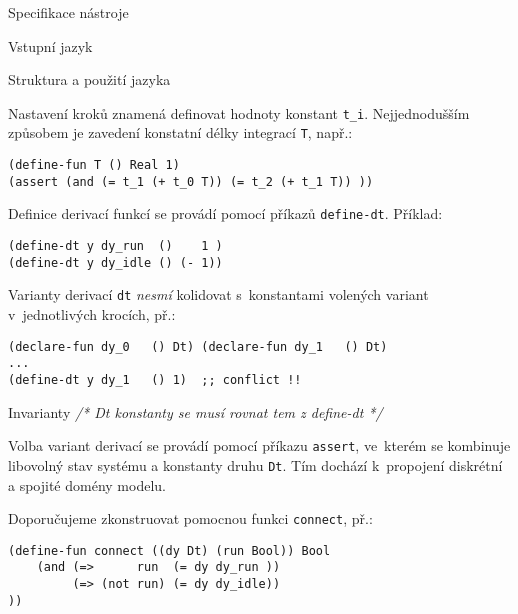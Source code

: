 \documentclass[thesis=M,czech]{FITthesis}[2012/06/26]
\newcommand{\cmt}[1]{\textit{/* #1 */}}
\newcommand{\id}[1]{\texttt{#1}}
\newcommand{\hl}[1]{\textit{#1}}
\begin{document}
\begin{section}{Specifikace nástroje}
\begin{subsection}{Vstupní jazyk}
\begin{subsubsection}{Struktura a použití jazyka}

\begin{paragraph}{Nastavení kroků}\label{p:design:spec:ilang:struct:step}
znamená definovat hodnoty konstant \id{t\_\-i}.
Nejjednodušším způsobem je zavedení konstatní délky
integrací \id{T}, např.:
\begin{verbatim}
(define-fun T () Real 1)
(assert (and (= t_1 (+ t_0 T)) (= t_2 (+ t_1 T)) ))
\end{verbatim}
\end{paragraph} %


\begin{paragraph}{Definice derivací funkcí}
\label{p:design:spec:ilang:struct:ode}
se provádí pomocí příkazů \id{define\--dt}.
Příklad:
\begin{verbatim}
(define-dt y dy_run  ()    1 )
(define-dt y dy_idle () (- 1))
\end{verbatim}

Varianty derivací \id{dt} \hl{nesmí} kolidovat s~konstantami
volených variant v~jednotlivých krocích, př.:
\begin{verbatim}
(declare-fun dy_0   () Dt) (declare-fun dy_1   () Dt)
...
(define-dt y dy_1   () 1)  ;; conflict !!
\end{verbatim}
\end{paragraph} %


\begin{paragraph}{Invarianty}
\label{p:design:spec:ilang:struct:inv}
\cmt{Dt konstanty se musí rovnat tem z define-dt}
\end{paragraph} %


\begin{paragraph}{Volba variant derivací}
\label{p:design:spec:ilang:struct:connect}
se provádí pomocí příkazu \id{assert},
ve~kterém se kombinuje libovolný stav systému
a konstanty druhu \id{Dt}.
Tím dochází k~propojení diskrétní a spojité domény modelu.

Doporučujeme zkonstruovat pomocnou funkci \id{connect}, př.:
\begin{verbatim}
(define-fun connect ((dy Dt) (run Bool)) Bool
    (and (=>      run  (= dy dy_run ))
         (=> (not run) (= dy dy_idle))
))
\end{verbatim}


\end{paragraph}
\end{subsubsection}
\end{subsection}
\end{section}
\end{document}
